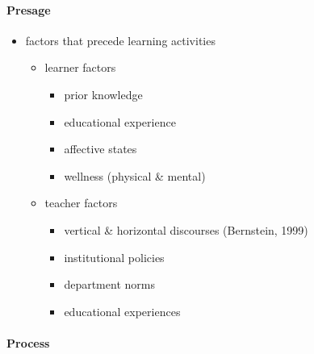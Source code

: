 \documentclass[
]{book}
\providecommand{\tightlist}{%
  \setlength{\itemsep}{0pt}\setlength{\parskip}{0pt}}
\begin{document}
\hypertarget{presage}{%
\paragraph*{Presage}\label{presage}}

\begin{itemize}
\tightlist
\item
  factors that precede learning activities

  \begin{itemize}
  \tightlist
  \item
    learner factors

    \begin{itemize}
    \tightlist
    \item
      prior knowledge\\
    \item
      educational experience\\
    \item
      affective states\\
    \item
      wellness (physical \& mental)\\
    \end{itemize}
  \item
    teacher factors

    \begin{itemize}
    \tightlist
    \item
      vertical \& horizontal discourses (Bernstein, 1999)\\
    \item
      institutional policies\\
    \item
      department norms\\
    \item
      educational experiences
    \end{itemize}
  \end{itemize}
\end{itemize}

\hypertarget{process}{%
\paragraph*{Process}\label{process}}
\end{document}
